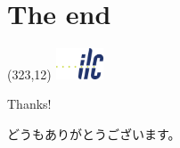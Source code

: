 \documentclass[xcolor={dvipsnames}]{beamer}
\newcommand{\ilclogo}{
  \setlength{\TPHorizModule}{1pt}
  \setlength{\TPVertModule}{1pt}
  \begin{textblock}{1}(323,12)
   \includegraphics[width=40pt,height=26pt]{figures/ILC.jpeg}
  \end{textblock}
}
\begin{document}
\section*{The end}
{
\begin{frame}
\ilclogo
\begin{center}
\textcolor{RubineRed}{
	\LARGE Thanks!\\
	\vspace*{0.5cm}
	\begin{CJK}{UTF8}{min}
	どうもありがとうございます。
	\end{CJK}
}
\end{center}
\end{frame}
}
\end{document}
